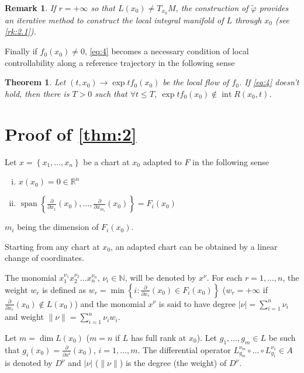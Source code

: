 \documentclass{article}
\newtheorem{theorem}{Theorem}
\newtheorem{remark}{Remark}[section]
\newcommand{\interior}{\operatorname{int}}
\newcommand{\N}{\mathbb{N}}
\begin{document}
\begin{remark}
	If $r=+\infty$ so that $L\left(x_0\right) \neq T_{x_0} M$, the construction of $\tilde{\varphi}$ provides an iterative method to construct the \emph{local} integral manifold of $L$ through $x_0$ (see \cref{rk:2.1}).
\end{remark} 

Finally if $f_0\left(x_0\right) \neq 0$, \eqref{eq:4} becomes a necessary condition of local controllability along a reference trajectory in the following sense

\begin{theorem} \label{thm:3}
	Let $\left(t, x_0\right) \rightarrow \exp  tf_0\left(x_0\right)$ be the local flow of $f_0$. 
	If \eqref{eq:4} doesn't hold, then there is $T>0$ such that $\forall t \leq T$, $\exp tf_0\left(x_0\right) \notin \interior R\left(x_0, t\right)$.
\end{theorem} 

\section{Proof of \texorpdfstring{\cref{thm:2}}{Theorem 2}}
\label{sec:2}

Let $x=\left\{x_1, \ldots, x_n\right\}$ be a chart at $x_0$ adapted to $F$ in the following sense
\begin{enumerate}[i)]
	\item $x\left(x_0\right)=0 \in \mathbb{R}^n$
	\item $\operatorname{span}\left\{\frac{\partial}{\partial x_1}\left(x_0\right), \ldots, \frac{\partial}{\partial x_{m_i}}\left(x_0\right)\right\}=F_i\left(x_0\right)$
\end{enumerate}
$m_i$ being the dimension of $F_i\left(x_0\right)$.

Starting from any chart at $x_0$, an adapted chart can be obtained by a linear change of coordinates.

The monomial $x_1^{\nu_1} x_2^{\nu_2} \ldots x_n^{\nu_n}$, $\nu_i \in \N$, will be denoted by $x^\nu$. 
For each $r=1, \ldots, n$, the weight $w_r$ is defined as $w_r=\min \left\{i: \frac{\partial}{\partial x_r}\left(x_0\right) \in F_i\left(x_0\right)\right\}$ ($w_r=+\infty$ if $\frac{\partial}{\partial x_r}\left(x_0\right) \notin L\left(x_0\right)$) and the monomial $x^\nu$ is said to have degree $|\nu|=\sum_{i=1}^n \nu_i$ and weight $\|\nu\|=\sum_{i=1}^n \nu_i w_i$.

Let $m=\operatorname{dim} L\left(x_0\right)$ ($m=n$ if $L$ has full rank at $x_0$). 
Let $g_1, \ldots, g_m \in L$ be such that $g_i\left(x_0\right)=\frac{\partial}{\partial x^i}\left(x_0\right)$, $i=1, \ldots, m$. 
The differential operator $L_{g_m}^{\nu_m} \circ \dotsc \circ L_{g_1}^{\nu_1} \in A$ is denoted by $D^\nu$ and $|\nu|$ ($\|\nu\|$) is the degree (the weight) of $D^\nu$.
\end{document}
